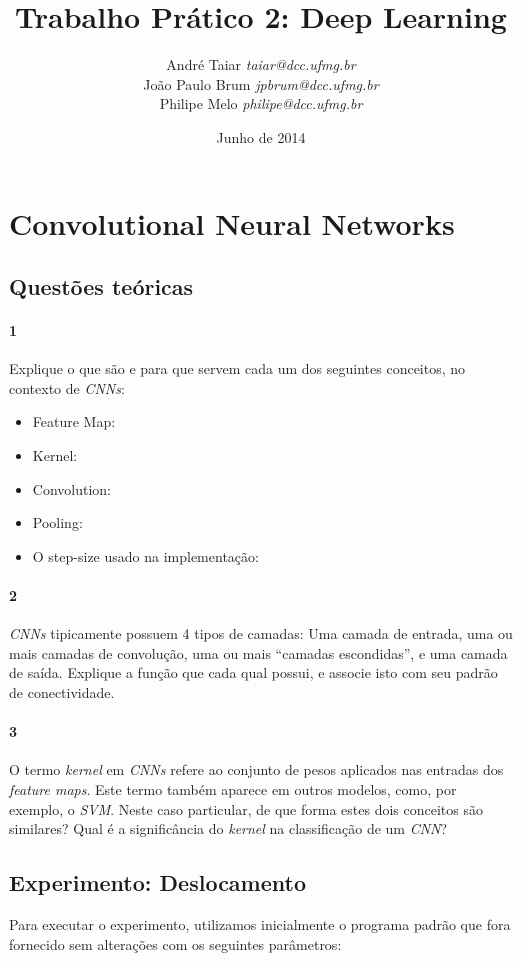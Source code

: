\documentclass[12pt, a4paper, brazil, portuguese]{article}
\title{Trabalho Prático 2: Deep Learning}
\date{Junho de 2014}
\author{
    André Taiar      \emph{taiar@dcc.ufmg.br}   \\
    João Paulo Brum  \emph{jpbrum@dcc.ufmg.br}  \\
    Philipe Melo     \emph{philipe@dcc.ufmg.br}
  }
\begin{document}
\maketitle

\section{Convolutional Neural Networks}
\subsection{Questões teóricas}
\paragraph{1} Explique o que são e para que servem cada um dos seguintes conceitos, no contexto de
  \emph{CNNs}:
\begin{itemize}
  \item Feature Map:
  \item Kernel:
  \item Convolution:
  \item Pooling:
  \item O step-size usado na implementação:
\end{itemize}

\paragraph{2} \emph{CNNs} tipicamente possuem 4 tipos de camadas: Uma camada de entrada, uma ou mais
  camadas de convolução, uma ou mais ``camadas escondidas'', e uma camada de saída. Explique a
  função que cada qual possui, e associe isto com seu padrão de conectividade.

\paragraph{3} O termo \emph{kernel} em \emph{CNNs} refere ao conjunto de pesos aplicados nas
  entradas dos \emph{feature maps}. Este termo também aparece em outros modelos, como, por exemplo,
  o \emph{SVM}. Neste caso particular, de que forma estes dois conceitos são similares? Qual é a
  significância do \emph{kernel} na classificação de um \emph{CNN}?

\subsection{Experimento: Deslocamento }
Para executar o experimento, utilizamos inicialmente o programa padrão que fora fornecido sem
alterações com os seguintes parâmetros:
\end{document}
